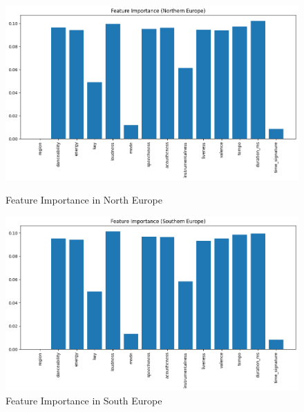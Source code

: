 \begin{figure}[h]
    \centering
    \begin{minipage}{0.45\textwidth}
        \centering
        \includegraphics[width=\linewidth]{media/rf_feature_imp_northen_europe.png}
        \caption{Feature Importance in North Europe}
    \end{minipage}%
    \hspace{0.05\textwidth} %
    \begin{minipage}{0.45\textwidth}
        \centering
        \includegraphics[width=\linewidth]{media/rf_feature_imp_southern_europe.png}
        \caption{Feature Importance in South Europe}
    \end{minipage}
\end{figure}

